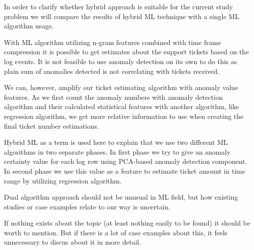In order to clarify whether hybrid approach is suitable for the current study problem
we will compare the results of hybrid ML technique
with a single ML algorithm usage.




With ML algorithm utilizing n-gram features combined with time frame compression
it is possible to get estimates
about the support tickets based on the log events.
It is not feasible to use anomaly detection on its own to do this
as plain sum of anomalies detected
is not correlating with tickets received.

We can, however,
amplify our ticket estimating algorithm with anomaly value features.
As we first count the anomaly numbers with anomaly detection algorithm %
and their calculated statistical features with another algorithm,
like regression algorithm,
we get more relative information to use
when creating the final ticket number estimations. %



\begin{itcomment}
    Hybrid ML as a term is used here to explain that we
    use two different ML algorithms in two separate phases.
    In first phase we try to give an anomaly certainty value for each log row
    using PCA-based anomaly detection component.
    In second phase we use this value as a feature to estimate ticket amount in time range
    by utilizing regression algorithm.

    Dual algorithm approach should not be unusual in ML field,
    but how existing studies or case examples relate to our way is uncertain.

    If nothing exists about the topic (at least nothing easily to be found)
    it should be worth to mention.
    But if there is a lot of case examples about this, it feels unnecessary
    to discus about it in more detail.
\end{itcomment}


\clearpage